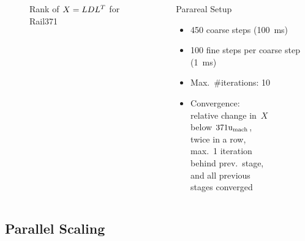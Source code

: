 \begin{frame}[label=other]{\secname}
\begin{columns}[onlytextwidth]
\begin{minipage}[b][0.75\textwidth][c]{\textwidth}
{\begin{figure}
  \caption{Rank of $X=LDL^T$ for Rail371}
  \end{figure}
}
  \end{minipage}
  \begin{block}{Parareal Setup}
    \begin{itemize}
      \item
        450 coarse steps (\SI{100}{\milli\second})
      \item
        100 fine steps per coarse step (\SI{1}{\milli\second})
      \item
        Max.~\#iterations: 10
      \item
        Convergence:\\
        relative change in~$X$\\ below $371\mathrm u_\text{mach}$,\\
        twice in a row,\\
        max.~1 iteration\\
        behind prev.~stage,\\
        and all previous\\
        stages converged
    \end{itemize}
  \end{block}
  \end{columns}
\end{frame}

\subsection{Parallel Scaling}

